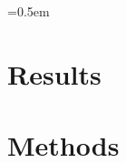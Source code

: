 \documentclass[a4paper, twocolumn]{article}
\begin{document}
\font=0.5em  %
\twocolumn


\section*{Results}



\section*{Methods}



\end{document}
